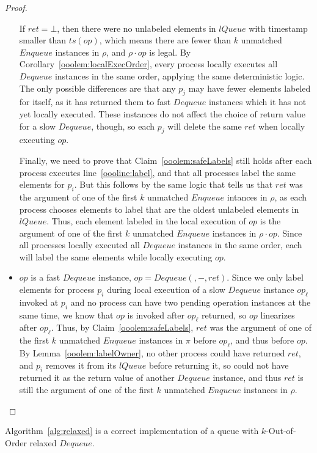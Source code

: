 \documentclass[a4paper,anonymous,USenglish]{lipics-v2021}
\theoremstyle{definition}
\begin{document}
\begin{proof}
\begin{itemize}
    If $ret = \bot$, then there were no unlabeled elements in $lQueue$ with timestamp smaller than $ts(op)$, which means there are fewer than $k$ unmatched $Enqueue$ instances in $\rho$, and $\rho \cdot op$ is legal.  By Corollary~\ref{ooolem:localExecOrder}, every process locally executes all $Dequeue$ instances in the same order, applying the same deterministic logic.  The only possible differences are that any $p_j$ may have fewer elements labeled for itself, as it has returned them to fast $Dequeue$ instances which it has not yet locally executed.  These instances do not affect the choice of return value for a slow $Dequeue$, though, so each $p_j$ will delete the same $ret$ when locally executing $op$.  

    Finally, we need to prove that Claim~\ref{ooolem:safeLabels} still holds after each process executes line~\ref{oooline:label}, and that all processes label the same elements for $p_i$.  But this follows by the same logic that tells us that $ret$ was the argument of one of the first $k$ unmatched $Enqueue$ intances in $\rho$, as each process chooses elements to label that are the oldest unlabeled elements in $lQueue$.  Thus, each element labeled in the local execution of $op$ is the argument of one of the first $k$ unmatched $Enqueue$ instances in $\rho \cdot op$.  Since all processes locally executed all $Dequeue$ instances in the same order, each will label the same elements while locally executing $op$.
%
  \item $op$ is a fast $Dequeue$ instance, $op = Dequeue(,-,ret)$.  Since we only label elements for process $p_i$ during local execution of a slow $Dequeue$ instance $op_\ell$ invoked at $p_i$ and no process can have two pending operation instances at the same time, we know that $op$ is invoked after $op_\ell$ returned, so $op$ linearizes after $op_\ell$.  Thus, by Claim~\ref{ooolem:safeLabels}, $ret$ was the argument of one of the first $k$ unmatched $Enqueue$ instances in $\pi$ before $op_\ell$, and thus before $op$.  By Lemma~\ref{ooolem:labelOwner}, no other process could have returned $ret$, and $p_i$ removes it from its $lQueue$ before returning it, so could not have returned it as the return value of another $Dequeue$ instance, and thus $ret$ is still the argument of one of the first $k$ unmatched $Enqueue$ instances in $\rho$.
  \end{itemize}
\end{proof}

\begin{theorem}
  Algorithm~\ref{alg:relaxed} is a correct implementation of a queue with $k$-Out-of-Order relaxed $Dequeue$.
\end{theorem}
\end{document}
